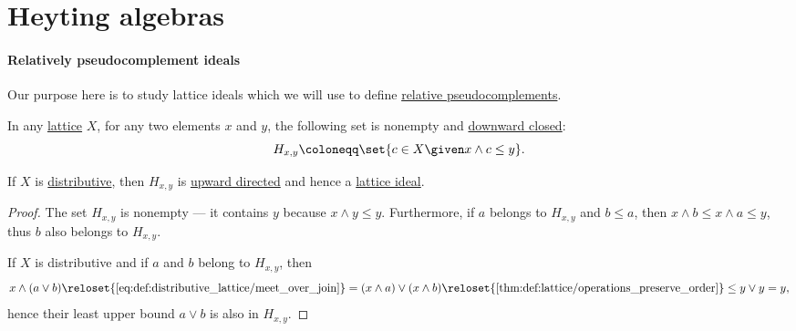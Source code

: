 \section{Heyting algebras}\label{sec:heyting_algebras}

\paragraph{Relatively pseudocomplement ideals}

Our purpose here is to study lattice ideals which we will use to define \hyperref[def:heyting_algebra]{relative pseudocomplements}.

\begin{proposition}\label{thm:relative_pseudocomplement_set_is_ideal}
  In any \hyperref[def:lattice]{lattice} \( X \), for any two elements \( x \) and \( y \), the following set is nonempty and \hyperref[def:closed_ordered_subset]{downward closed}:
  \begin{equation*}
    H_{x,y} \coloneqq \set{ c \in X \given x \wedge c \leq y }.
  \end{equation*}

  If \( X \) is \hyperref[def:distributive_lattice]{distributive}, then \( H_{x,y} \) is \hyperref[def:directed_set]{upward directed} and hence a \hyperref[def:lattice_ideal]{lattice ideal}.
\end{proposition}
\begin{proof}
  The set \( H_{x,y} \) is nonempty --- it contains \( y \) because \( x \wedge y \leq y \). Furthermore, if \( a \) belongs to \( H_{x,y} \) and \( b \leq a \), then \( x \wedge b \leq x \wedge a \leq y \), thus \( b \) also belongs to \( H_{x,y} \).

  If \( X \) is distributive and if \( a \) and \( b \) belong to \( H_{x,y} \), then
  \begin{equation*}
    x \wedge (a \vee b)
    \reloset {\eqref{eq:def:distributive_lattice/meet_over_join}} =
    (x \wedge a) \vee (x \wedge b)
    \reloset {\ref{thm:def:lattice/operations_preserve_order}} \leq
    y \vee y
    =
    y,
  \end{equation*}
  hence their least upper bound \( a \vee b \) is also in \( H_{x,y} \).
\end{proof}

